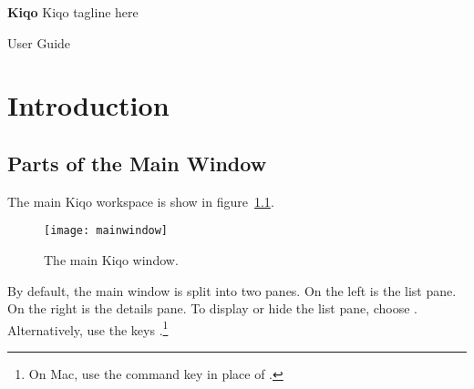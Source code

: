 \documentclass[11pt,fleqn]{book} %
\begin{document}

\begingroup
\thispagestyle{empty}
\centering
\vspace*{5cm}
\par\normalfont\fontsize{35}{35}\sffamily\selectfont
\textbf{Kiqo}
{\LARGE Kiqo tagline here}\par %
\vspace*{1cm}
{\Huge User Guide}\par %
\endgroup


\tableofcontents %


\chapter{Introduction}

\section{Parts of the Main Window}
The main Kiqo workspace is show in figure~\ref{fig:mainwindow}.

\begin{figure}[h]
  \centering
  \texttt{[image: mainwindow]}
  \caption{The main Kiqo window.\label{fig:mainwindow}}
\end{figure}

\pagebreak
By default, the main window is split into two panes.
On the left is the list pane.
On the right is the details pane.
To display or hide the list pane, choose .
Alternatively, use the keys .\footnote{On Mac,
use the command key \keys{\cmd} in place of \keys{\ctrl}.}
\end{document}
